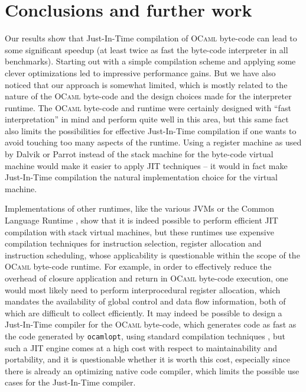 \documentclass[12pt,a4paper,final]{article}
\begin{document}
\section{Conclusions and further work} \label{section:Conclusions_and_further_work}

Our results show that Just-In-Time compilation of \textsc{OCaml} byte-code can lead
to some significant speedup (at least twice as fast the byte-code interpreter in all
benchmarks). Starting out with a simple compilation scheme and applying some clever
optimizations led to impressive performance gains. But we have also noticed that our
approach is somewhat limited, which is mostly related to the nature of the \textsc{OCaml}
byte-code and the design choices made for the interpreter runtime.
The \textsc{OCaml} byte-code and runtime were certainly designed with ``fast interpretation''
in mind \cite{Leroy90} and perform quite well in this area, but this same fact also limits the
possibilities for effective Just-In-Time compilation if one wants to avoid touching too
many aspects of the runtime. Using a register machine as used by Dalvik \cite{Bornstein08}
or Parrot \cite{Coleda10} instead of the stack machine for the byte-code virtual machine would
make it easier to apply JIT techniques -- it would in fact make Just-In-Time compilation
the natural implementation choice for the virtual machine.

Implementations of other runtimes, like the various JVMs \cite{LindholmYellin99} or the
Common Language Runtime \cite{Ecma335},
show that it is indeed possible to perform efficient JIT compilation with stack virtual machines, but
these runtimes use expensive compilation techniques for instruction selection, register
allocation and instruction scheduling, whose applicability is questionable
within the scope of the \textsc{OCaml} byte-code runtime. For example, in order to
effectively reduce the overhead of closure application and return in \textsc{OCaml}
byte-code execution, one would most likely need to perform interprocedural register allocation,
which mandates the availability of global control and data flow information, both of which are
difficult to collect efficiently.
It may indeed be possible to design a Just-In-Time compiler for the \textsc{OCaml}
byte-code, which generates code as fast as the code generated by \texttt{ocamlopt},
using standard compilation techniques \cite{Aho06}, but such a JIT engine comes at
a high cost with respect to maintainability and portability, and it is questionable whether
it is worth this cost, especially since there is already an optimizing native code
compiler, which limits the possible use cases for the Just-In-Time compiler.
\end{document}
